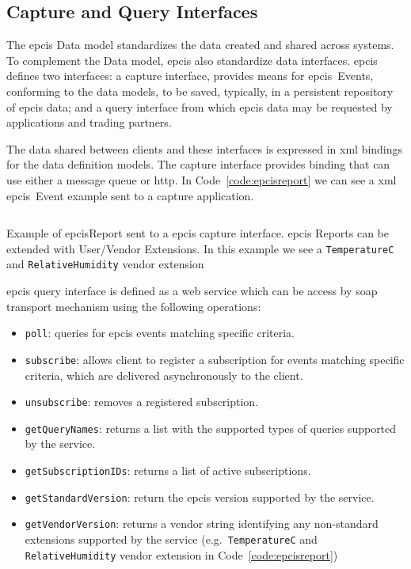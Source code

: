\subsection{Capture and Query Interfaces}

The \ac{epcis} Data model standardizes the data created and shared across systems. 
To complement the Data model, \ac{epcis} also standardize data interfaces.
\ac{epcis} defines two interfaces: a capture interface, provides means for \ac{epcis}~Events, conforming to the data models, to be saved, typically, in a persistent repository of \ac{epcis} data; and a query interface from which \ac{epcis} data may be requested by applications and trading partners.

The data shared between clients and these interfaces is expressed in \ac{xml} bindings for the data definition models.
The capture interface provides binding that can use either a message queue or \ac{http}. In Code~\ref{code:epcisreport} we can see a \ac{xml} \ac{epcis}~Event example sent to a capture application. 

\begin{listing}
    \inputminted[linenos, breaklines]{xml}{./code/sota/EPCIS_query_response.xml}
    \caption{Example of \ac{epcis}Report sent to a \ac{epcis} capture interface. \ac{epcis} Reports can be extended with User/Vendor Extensions. In this example we see a \texttt{TemperatureC} and \texttt{RelativeHumidity} vendor extension}
    \label{code:epcisreport}
\end{listing}

\ac{epcis} query interface is defined as a web service which can be access by \ac{soap} transport mechanism using the following operations: 

\begin{itemize}
    \item \texttt{poll}: queries for \ac{epcis} events matching specific criteria.
    \item \texttt{subscribe}: allows client to register a subscription for events matching specific criteria, which are delivered asynchronously to the client. 
    \item \texttt{unsubscribe}: removes a registered subscription.
    \item \texttt{getQueryNames}: returns a list with the supported types of queries supported by the service.
    \item \texttt{getSubscriptionIDs}: returns a list of active subscriptions.
    \item \texttt{getStandardVersion}: return the \ac{epcis} version supported by the service.
    \item \texttt{getVendorVersion}: returns a vendor string identifying any non-standard extensions supported by the service (e.g.\ \texttt{TemperatureC} and \texttt{RelativeHumidity} vendor extension in Code~\ref{code:epcisreport})
\end{itemize}

